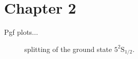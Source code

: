 \chapter{Chapter 2}\label{chap:chapter_2}
Pgf plots...

\begin{figure}[htb]
	\centering	
	\begin{tikzpicture}[scale=0.88]
	
	\end{tikzpicture}
	\caption[ splitting]{ splitting of the \Rb ground state $5^2\mathrm{S}_{1/2}$.}
	\label{fig:zeeman_splitting_breit_rabi}
\end{figure}